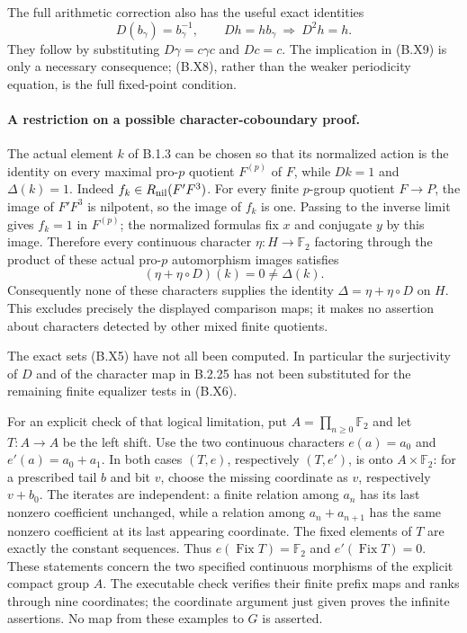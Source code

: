 The full arithmetic correction also has the useful exact
identities
\[
 D(b_\gamma)=b_\gamma^{-1},\qquad
 Dh=h b_\gamma\ \Longrightarrow\ D^2h=h.
 \tag{B.X9}
\]
They follow by substituting $D\gamma=c\gamma c$ and
$Dc=c$.  The implication in (B.X9) is only a necessary
consequence; (B.X8), rather than the weaker periodicity
equation, is the full fixed-point condition.

\paragraph{A restriction on a possible character-coboundary proof.}
The actual element $k$ of B.1.3 can be chosen so that its
normalized action is the identity on every maximal pro-$p$
quotient $F^{(p)}$ of $F$, while $Dk=1$ and $\Delta(k)=1$.
Indeed $f_k\in R_{\rm nil}(F'F^3)$.  For every finite
$p$-group quotient $F\to P$, the image of $F'F^3$ is
nilpotent, so the image of $f_k$ is one.  Passing to the
inverse limit gives $f_k=1$ in $F^{(p)}$; the normalized
formulas fix $x$ and conjugate $y$ by this image.  Therefore
every continuous character $\eta:H\to\mathbb F_2$ factoring
through the product of these actual pro-$p$ automorphism
images satisfies
\[
                 (\eta+\eta\circ D)(k)=0\ne\Delta(k).
 \tag{B.X10}
\]
Consequently none of these characters supplies the identity
$\Delta=\eta+\eta\circ D$ on $H$.  This excludes precisely
the displayed comparison maps; it makes no assertion about
characters detected by other mixed finite quotients.

The exact sets (B.X5) have not all been computed.  In
particular the surjectivity of $D$ and of the character
map in B.2.25 has not been substituted for the remaining
finite equalizer tests in (B.X6).

For an explicit check of that logical limitation, put
$A=\prod_{n\ge0}\mathbb F_2$ and let $T:A\to A$ be
the left shift.  Use the two continuous characters
$e(a)=a_0$ and $e'(a)=a_0+a_1$.  In both cases
$(T,e)$, respectively $(T,e')$, is onto $A\times\mathbb F_2$:
for a prescribed tail $b$ and bit $v$, choose the missing
coordinate as $v$, respectively $v+b_0$.
The iterates are independent: a finite relation among
$a_n$ has its last nonzero coefficient unchanged, while
a relation among $a_n+a_{n+1}$ has the same nonzero
coefficient at its last appearing coordinate.  The
fixed elements of $T$ are exactly the constant sequences.
Thus $e(\operatorname{Fix}T)=\mathbb F_2$ and
$e'(\operatorname{Fix}T)=0$.  These statements concern
the two specified continuous morphisms of the explicit
compact group $A$.  The executable check
 verifies their finite
prefix maps and ranks through nine coordinates; the
coordinate argument just given proves the infinite
assertions.  No map from these examples to $G$ is asserted.
